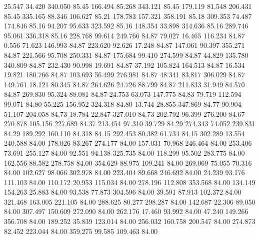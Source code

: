   25.547   34.420  340.050        85.45
 166.494   85.268  343.121        85.45
 179.119   81.548  206.431        85.45
 335.165   88.346  106.627        85.21
 178.783  157.321  358.191        85.18
 309.353   74.487  174.846        85.16
  94.207   95.633  323.592        85.16
 148.354   33.898  314.636        85.16
 289.746   95.061  336.318        85.16
 228.768   99.614  249.766        84.87
  79.027   16.465  116.234        84.87
   0.556   71.623  146.993        84.87
 223.620   92.626   17.248        84.87
 147.061   90.397  355.271        84.87
 221.566   95.708  250.331        84.87
 175.684   99.410  274.599        84.87
  44.829  135.780  340.809        84.87
 232.430   90.998   19.691        84.87
  37.192  105.824  164.513        84.87
  16.534   19.821  180.766        84.87
 103.693   56.499  276.981        84.87
  48.341   83.817  306.029        84.87
 149.761   18.121   80.345        84.87
 264.626   24.726   88.799        84.87
 211.833   31.949   84.570        84.87
 269.830   95.324   88.081        84.87
  24.753   63.073  147.775        84.83
  79.719  112.594   99.071        84.80
  55.225  156.952  324.318        84.80
  13.744   28.855  347.869        84.77
  90.904   51.107  204.058        84.73
  18.784   22.847  327.010        84.73
 202.792   96.399  276.200        84.67
 270.878  105.156  227.689        84.37
 213.454   97.310   39.729        84.29
 274.343   74.052  239.831        84.29
 189.292  160.110   84.318        84.15
 292.453   80.382   61.734        84.15
 302.289   13.554  240.588        84.00
 178.026   83.267  274.177        84.00
 157.031   70.968  246.464        84.00
 253.406   73.691  255.127        84.00
  92.551   94.138  325.735        84.00
 118.299   95.502  283.775        84.00
 162.556   88.582  278.758        84.00
 354.629   88.975  109.241        84.00
 269.069   75.055   70.316        84.00
 102.627   98.066  302.978        84.00
 223.404   89.668  246.692        84.00
  24.239   93.176  111.103        84.00
 110.172   20.953  115.034        84.00
 278.196  112.808  353.568        84.00
 134.149  154.263   25.883        84.00
  93.538   77.873  304.596        84.00
  39.591   87.913  102.372        84.00
 321.468  163.005  221.105        84.00
 288.625   80.277  298.287        84.00
 142.687   22.306   89.050        84.00
 307.497  150.609  272.090        84.00
 262.176   17.460   93.992        84.00
  47.240  149.266  356.708        84.00
 189.252   35.839  123.014        84.00
 256.032  160.758  200.547        84.00
 274.873   82.452  223.044        84.00
 359.275   99.585  109.463        84.00

